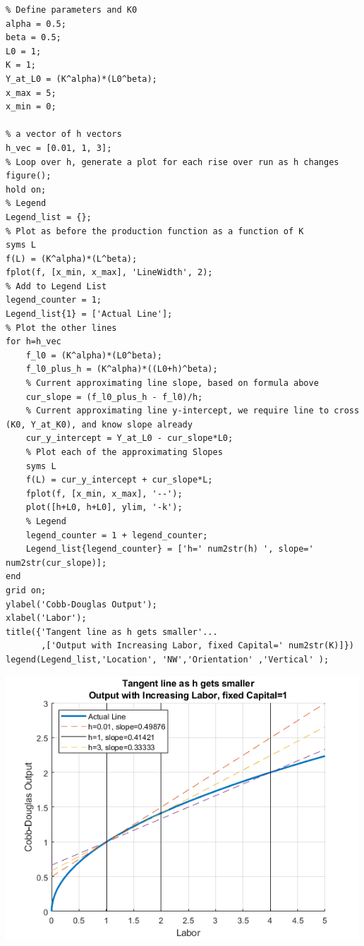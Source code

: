 \documentclass[
]{book}
\begin{document}
\begin{verbatim}
% Define parameters and K0
alpha = 0.5;
beta = 0.5;
L0 = 1;
K = 1;
Y_at_L0 = (K^alpha)*(L0^beta);
x_max = 5;
x_min = 0;

% a vector of h vectors
h_vec = [0.01, 1, 3];
% Loop over h, generate a plot for each rise over run as h changes
figure();
hold on;
% Legend
Legend_list = {};
% Plot as before the production function as a function of K
syms L
f(L) = (K^alpha)*(L^beta);
fplot(f, [x_min, x_max], 'LineWidth', 2);
% Add to Legend List
legend_counter = 1;
Legend_list{1} = ['Actual Line'];
% Plot the other lines
for h=h_vec
    f_l0 = (K^alpha)*(L0^beta);
    f_l0_plus_h = (K^alpha)*((L0+h)^beta);
    % Current approximating line slope, based on formula above
    cur_slope = (f_l0_plus_h - f_l0)/h;
    % Current approximating line y-intercept, we require line to cross (K0, Y_at_K0), and know slope already
    cur_y_intercept = Y_at_L0 - cur_slope*L0;
    % Plot each of the approximating Slopes
    syms L
    f(L) = cur_y_intercept + cur_slope*L;
    fplot(f, [x_min, x_max], '--');
    plot([h+L0, h+L0], ylim, '-k');
    % Legend
    legend_counter = 1 + legend_counter;
    Legend_list{legend_counter} = ['h=' num2str(h) ', slope=' num2str(cur_slope)];
end
grid on;
ylabel('Cobb-Douglas Output');
xlabel('Labor');
title({'Tangent line as h gets smaller'...
       ,['Output with Increasing Labor, fixed Capital=' num2str(K)]})
legend(Legend_list,'Location', 'NW','Orientation' ,'Vertical' );
\end{verbatim}

\includegraphics[width=5.20833in,height=\textheight]{img/derivative_hslope_cobb_douglas_images/figure_1.png}
\end{document}
